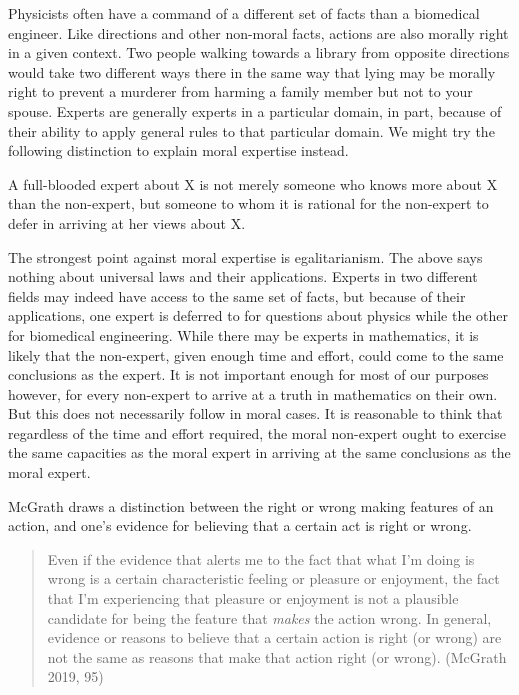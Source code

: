 \documentclass[12pt]{book}
\theoremstyle{definition}
\theoremstyle{remark}
\newcommand{\NormalTok}[1]{#1}
\newenvironment{Shaded}{}{}
\newenvironment{Highlighting}{}{}
\begin{document}
Physicists often have a command of a different set of facts than a biomedical engineer. Like directions and other non-moral facts, actions are also morally right in a given context. Two people walking towards a library from opposite directions would take two different ways there in the same way that lying may be morally right to prevent a murderer from harming a family member but not to your spouse. Experts are generally experts in a particular domain, in part, because of their ability to apply general rules to that particular domain. We might try the following distinction to explain moral expertise instead.

\begin{Shaded}
\begin{Highlighting}[]

\NormalTok{A full{-}blooded expert about X is not merely someone who knows more about X than the non{-}expert, but someone to whom it is rational for the non{-}expert to defer in arriving at her views about X.}
\end{Highlighting}
\end{Shaded}

The strongest point against moral expertise is egalitarianism. The above says nothing about universal laws and their applications. Experts in two different fields may indeed have access to the same set of facts, but because of their applications, one expert is deferred to for questions about physics while the other for biomedical engineering. While there may be experts in mathematics, it is likely that the non-expert, given enough time and effort, could come to the same conclusions as the expert. It is not important enough for most of our purposes however, for every non-expert to arrive at a truth in mathematics on their own. But this does not necessarily follow in moral cases. It is reasonable to think that regardless of the time and effort required, the moral non-expert ought to exercise the same capacities as the moral expert in arriving at the same conclusions as the moral expert.

McGrath draws a distinction between the right or wrong making features of an action, and one's evidence for believing that a certain act is right or wrong.

\begin{quote}
Even if the evidence that alerts me to the fact that what I'm doing is wrong is a certain characteristic feeling or pleasure or enjoyment, the fact that I'm experiencing that pleasure or enjoyment is not a plausible candidate for being the feature that \emph{makes} the action wrong. In general, evidence or reasons to believe that a certain action is right (or wrong) are not the same as reasons that make that action right (or wrong). (McGrath 2019, 95)
\end{quote}
\end{document}

